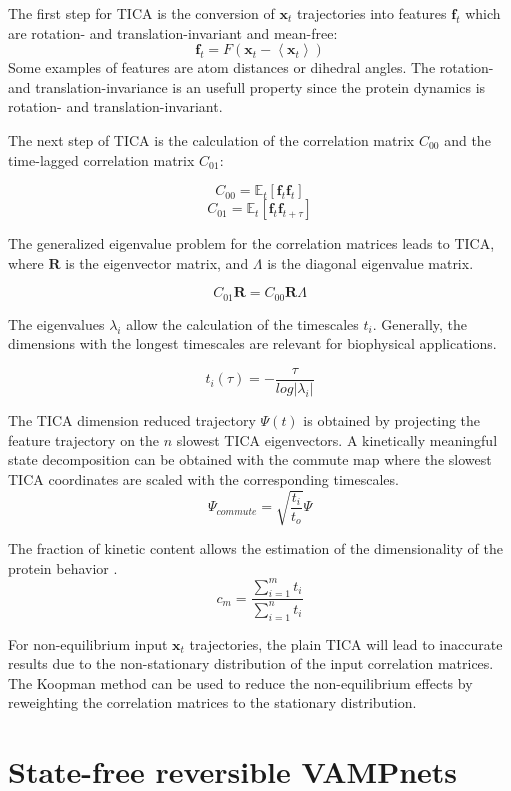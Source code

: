 The first step for TICA is the conversion of $\mathbf{x}_{t}$ trajectories into features $\mathbf{f}_{t}$ which are rotation- and translation-invariant and mean-free:
$$\mathbf{f}_{t}=F\left(\mathbf{x}_{t}-\left\langle \mathbf{x}_{t}\right\rangle \right)$$  
Some examples of features are atom distances or dihedral angles. The rotation- and translation-invariance is an usefull property since the protein dynamics is rotation- and translation-invariant.

The next step of TICA is the calculation of the correlation matrix $C_{00}$ and the time-lagged correlation matrix $C_{01}$:

$$C_{00}=\ensuremath{\mathbb{E}}_{t}\left[\mathbf{f}_{t}\mathbf{f}_{t}\right]$$
$$C_{01}=\ensuremath{\mathbb{E}}_{t}\left[\mathbf{f}_{t}\mathbf{f}_{t+\tau}\right]$$

The generalized eigenvalue problem for the correlation matrices leads to TICA, where $\mathbf{R}$ is the eigenvector matrix, and $\mathbf{\varLambda}$ is the diagonal eigenvalue matrix. 

$$C_{01}\mathbf{R}=C_{00}\mathbf{R}\mathbf{\varLambda}$$

The eigenvalues $\lambda_{i}$ allow the calculation of the timescales $t_{i}$. Generally, the dimensions with the longest timescales are relevant for biophysical applications.

$$t_{i}(\tau)=-\frac{\tau}{log\left|\lambda_{i}\right|}$$ 

The TICA dimension reduced trajectory $\varPsi(t)$ is obtained by projecting the feature trajectory on the $n$ slowest TICA eigenvectors. A kinetically meaningful state decomposition can be obtained with the commute map\cite{noe2016commute} where the slowest TICA coordinates are scaled with the corresponding timescales.
$$\varPsi_{commute}=\sqrt{\frac{t_{i}}{t_{o}}}\varPsi$$

The fraction of kinetic content allows the estimation of the dimensionality of the protein behavior \cite{noe2016commute}.
$$c_{m}=\frac{\sum_{i=1}^{m}t_{i}}{\sum_{i=1}^{n}t_{i}}$$

For non-equilibrium input $\mathbf{x}_{t}$ trajectories, the plain TICA will lead to inaccurate results due to the non-stationary distribution of the input correlation matrices. The Koopman method \cite{koopmanold,
koopman2,koopman3,koopman4, wu2017variational, Nueske2017} can be used to reduce
the non-equilibrium effects by reweighting the correlation matrices to the stationary distribution.

\section{State-free reversible VAMPnets}

